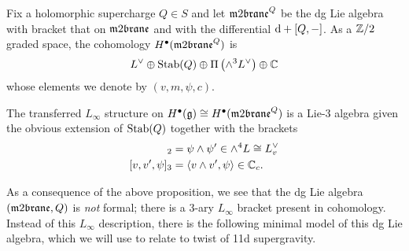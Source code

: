 \documentclass[11pt]{amsart}
\begin{document}
\begin{prop}\label{prop:model}
Fix a holomorphic supercharge $Q \in S$ and let $\m2^Q$ be the dg Lie algebra with bracket that on $\m2$ and with the differential ${\rm d} + [Q,-]$. 
As a $\mathbb Z/2$ graded space, the cohomology $H^\bu(\m2^Q)$ is
\[
    L^\vee \oplus {\rm Stab}(Q) \oplus \Pi \left(\wedge^3 L^\vee\right) \oplus \mathbb C
  \]
whose elements we denote by $(v, m, \psi, c)$.

The transferred $L_\infty$ structure on $H^\bu(\fg) \cong H^\bu(\m2^Q)$ is a Lie-3 algebra given the obvious extension of ${\rm Stab}(Q)$ together with the brackets
\begin{align*}
[\psi, \psi']_2 & = \psi \wedge \psi' \in \wedge^4 L \cong L^\vee_v \\
[v, v', \psi]_3 & = \<v \wedge v', \psi\> \in \CC_c .
\end{align*}
\end{prop}

\parsec[]

As a consequence of the above proposition, we see that the dg Lie algebra $(\m2,Q)$ is {\em not} formal; there is a 3-ary $L_\infty$ bracket present in cohomology. 
Instead of this $L_\infty$ description, there is the following minimal model of this dg Lie algebra, which we will use to relate to twist of 11d supergravity. 
\end{document}
